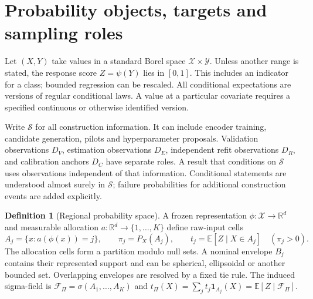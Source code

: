 \documentclass[11pt,a4paper]{article}
\newcommand{\E}{\mathbb E}\newcommand{\Pp}{\mathbb P}
\newcommand{\R}{\mathbb R}\newcommand{\ind}{\mathbf 1}
\numberwithin{equation}{section}
\theoremstyle{definition}\newtheorem{definition}[theorem]{Definition}
\theoremstyle{remark}\newtheorem{remark}[theorem]{Remark}
\begin{document}
\section{Probability objects, targets and sampling roles}\label{sec:setup}
Let $(X,Y)$ take values in a standard Borel space $\mathcal X\times\mathcal Y$. Unless another range is stated, the response score $Z=\psi(Y)$ lies in $[0,1]$. This includes an indicator for a class; bounded regression can be rescaled. All conditional expectations are versions of regular conditional laws. A value at a particular covariate requires a specified continuous or otherwise identified version.

Write $\mathcal S$ for all construction information. It can include encoder training, candidate generation, pilots and hyperparameter proposals. Validation observations $D_V$, estimation observations $D_E$, independent refit observations $D_R$, and calibration anchors $D_C$ have separate roles. A result that conditions on $\mathcal S$ uses observations independent of that information. Conditional statements are understood almost surely in $\mathcal S$; failure probabilities for additional construction events are added explicitly.

\begin{definition}[Regional probability space]\label{def:region}
A frozen representation $\phi:\mathcal X\to\R^d$ and measurable allocation $a:\R^d\to\{1,\ldots,K\}$ define raw-input cells
\[
 A_j=\{x:a(\phi(x))=j\},\qquad
 \pi_j=P_X(A_j),\qquad t_j=\E[Z\mid X\in A_j]\quad(\pi_j>0).
\]
The allocation cells form a partition modulo null sets. A nominal envelope $B_j$ contains their represented support and can be spherical, ellipsoidal or another bounded set. Overlapping envelopes are resolved by a fixed tie rule. The induced sigma-field is
$\mathcal F_\Pi=\sigma(A_1,\ldots,A_K)$ and
$t_\Pi(X)=\sum_jt_j\ind_{A_j}(X)=\E[Z\mid\mathcal F_\Pi]$.
\end{definition}
\end{document}
